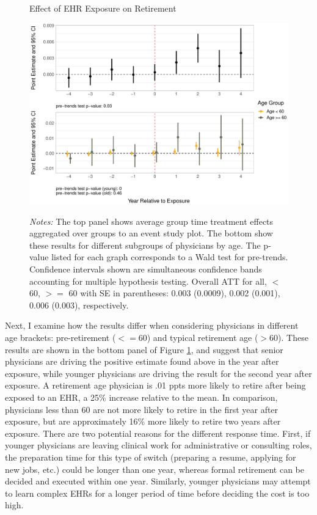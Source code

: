 \documentclass[12pt]{article}
\begin{document}
\begin{figure}[ht!]
    \centering
    \captionsetup{width=.85\linewidth}
    \caption{Effect of EHR Exposure on Retirement}
    \includegraphics[scale=.6]{Objects/retire_plot.pdf}
    \label{fig:retirefirst}
    \vspace{2mm}
    \caption*{\footnotesize{\textit{Notes:} The top panel shows average group time treatment effects aggregated over groups to an event study plot. The bottom show these results for different subgroups of physicians by age. The p-value listed for each graph corresponds to a Wald test for pre-trends. Confidence intervals shown are simultaneous confidence bands accounting for multiple hypothesis testing. Overall ATT for all, $<$ 60, $>=$ 60 with SE in parentheses: 0.003 (0.0009), 0.002 (0.001), 0.006 (0.003), respectively.}}
\end{figure}


Next, I examine how the results differ when considering physicians in different age brackets: pre-retirement ($<= 60$) and typical retirement age ($> 60$). These results are shown in the bottom panel of Figure \ref{fig:retirefirst}, and suggest that senior physicians are driving the positive estimate found above in the year after exposure, while younger physicians are driving the result for the second year after exposure. A retirement age physician is .01 ppts more likely to retire after being exposed to an EHR, a 25\% increase relative to the mean. In comparison, physicians less than 60 are not more likely to retire in the first year after exposure, but are approximately 16\% more likely to retire two years after exposure. There are two potential reasons for the different response time. First, if younger physicians are leaving clinical work for administrative or consulting roles, the preparation time for this type of switch (preparing a resume, applying for new jobs, etc.) could be longer than one year, whereas formal retirement can be decided and executed within one year. Similarly, younger physicians may attempt to learn complex EHRs for a longer period of time before deciding the cost is too high. 
\end{document}
